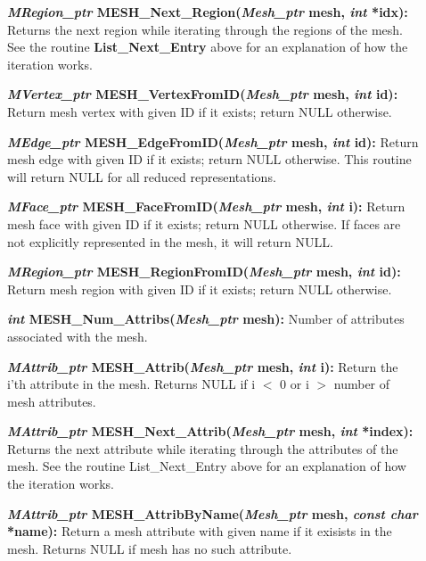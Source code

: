 \documentclass[12pt]{article}
\begin{document}
\begin{description}
\item[]\textbf{\textit{MRegion\_ptr}
    MESH\_Next\_Region(\textit{Mesh\_ptr} mesh, \textit{int} *idx):}
  Returns the next region while iterating through the regions of the
  mesh. See the routine \textbf{List\_Next\_Entry} above for an
  explanation of how the iteration works.
  
\item[]

\item[]\textbf{\textit{MVertex\_ptr}
    MESH\_VertexFromID(\textit{Mesh\_ptr} mesh, \textit{int} id):}
  Return mesh vertex with given ID if it exists; return NULL
  otherwise.
  
\item[]\textbf{\textit{MEdge\_ptr} MESH\_EdgeFromID(\textit{Mesh\_ptr}
    mesh, \textit{int} id):} Return mesh edge with given ID if it
  exists; return NULL otherwise. This routine will return NULL for all
  reduced representations.

\item[]\textbf{\textit{MFace\_ptr} MESH\_FaceFromID(\textit{Mesh\_ptr}
    mesh, \textit{int} i):} Return mesh face with given ID if it
  exists; return NULL otherwise. If faces are not explicitly
  represented in the mesh, it will return NULL.


\item[]\textbf{\textit{MRegion\_ptr}
    MESH\_RegionFromID(\textit{Mesh\_ptr} mesh, \textit{int} id):}
  Return mesh region with given ID if it exists; return NULL
  otherwise.

\item[]

\item[]\textbf{\textit{int} MESH\_Num\_Attribs(\textit{Mesh\_ptr}
    mesh):} Number of attributes associated with the mesh.
  
\item[]\textbf{\textit{MAttrib\_ptr} MESH\_Attrib(\textit{Mesh\_ptr}
    mesh, \textit{int} i):} Return the i'th attribute in the mesh.
  Returns NULL if i $<$ 0 or i $>$ number of mesh attributes.
 
\item[]\textbf{\textit{MAttrib\_ptr}
    MESH\_Next\_Attrib(\textit{Mesh\_ptr} mesh, \textit{int} *index):}
  Returns the next attribute while iterating through the attributes of
  the mesh. See the routine List\_Next\_Entry above for an explanation
  of how the iteration works.
  
\item[]\textbf{\textit{MAttrib\_ptr}
    MESH\_AttribByName(\textit{Mesh\_ptr} mesh, \textit{const char}
    *name):} Return a mesh attribute with given name if it exisists in
  the mesh. Returns NULL if mesh has no such attribute.


\end{description}
\end{document}

